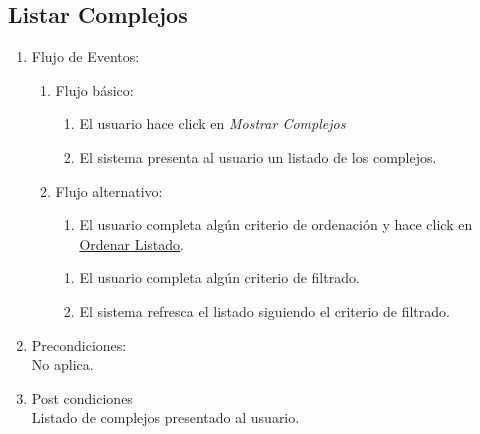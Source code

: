 \documentclass[a4paper,11pt]{article}
\begin{document}
\subsection{Listar Complejos}
\begin{enumerate}


    \begin{enumerate}
    \item Descripción breve: \\
        Se le presenta al usuario un listado de las complejos deportivos cargados en el sistema.
    \item Actores \\
        Usuario genérico.
    \item Disparadores: \\
        El usuario hace click en \emph{Mostrar Complejos}.
    \end{enumerate}

    \item Flujo de Eventos: 

    \begin{enumerate}

        \item Flujo básico:
        \begin{enumerate}
                    \item El usuario hace click en \emph{Mostrar Complejos}
                    \item El sistema presenta al usuario un listado de los complejos.
        \end{enumerate}
        \item Flujo alternativo:\\
        \begin{enumerate}
                    \item El usuario completa algún criterio de ordenación y
                        hace click en \underline{Ordenar Listado}.
        \end{enumerate}
        \begin{enumerate}
            \item El usuario completa algún criterio de filtrado.
            \item El sistema refresca el listado siguiendo el criterio de filtrado.
        \end{enumerate}
    \end{enumerate}

    \item Precondiciones: \\
        No aplica.

    \item Post condiciones \\
        Listado de complejos presentado al usuario.

\end{enumerate}
\end{document}
